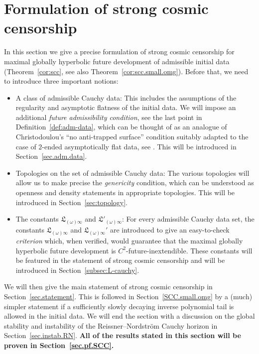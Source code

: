 \documentclass[10pt, reqno]{amsart}
\theoremstyle{definition}
\theoremstyle{remark}
\numberwithin{equation}{section}
\newcommand{\0}{\emptyset}
\newcommand{\omg}{\omega}
\begin{document}
\section{Formulation of strong cosmic censorship}\label{sec.SCC}
In this section we give a precise formulation of strong cosmic censorship for maximal globally hyperbolic future development of admissible initial data (Theorem~\ref{cor:scc}, see also Theorem~\ref{cor:scc.small.omg}). Before that, we need to introduce three important notions:
\begin{itemize}
\item A class of admissible Cauchy data: This includes the assumptions of the regularity and asymptotic flatness of the initial data. We will impose an additional \emph{future admissibility condition}, see the last point in Definition~\ref{def:adm-data}, which can be thought of as an analogue of Christodoulou's ``no anti-trapped surface'' condition suitably adapted to the case of $2$-ended asymptotically flat data, see \cite{D3}. This will be introduced in Section~\ref{sec.adm.data}.
\item Topologies on the set of admissible Cauchy data: The various topologies will allow us to make precise the \emph{genericity} condition, which can be understood as openness and density statements in appropriate topologies. This will be introduced in Section~\ref{sec:topology}.
\item The constants $\mathfrak L_{(\omg)\infty}$ and $\mathfrak L'_{(\omg)\infty}$: For every admissible Cauchy data set, the constants $\mathfrak L_{(\omg)\infty}$ and $\mathfrak L_{(\omg)\infty}'$ are introduced to give an easy-to-check \emph{criterion} which, when verified, would guarantee that the maximal globally hyperbolic future development is $C^2$-future-inextendible. These constants will be featured in the statement of strong cosmic censorship and will be introduced in Section~\ref{subsec:L-cauchy}.
\end{itemize}

We will then give the main statement of strong cosmic censorship in Section~\ref{sec.statement}. This is followed in Section~\ref{SCC.small.omg} by a (much) simpler statement if a sufficiently slowly decaying inverse polynomial tail is allowed in the initial data. We will end the section with a discussion on the global stability and instability of the Reissner--Nordstr\"om Cauchy horizon in Section~\ref{sec.instab.RN}. \textbf{All of the results stated in this section will be proven in Section~\ref{sec.pf.SCC}.}
\end{document}
